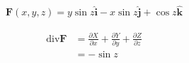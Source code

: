 \begin{align*}
    \boldsymbol{F}(x, y, z) = y\sin{z} \boldsymbol{\hat{i}} - x\sin{z} \boldsymbol{\hat{j}} + \cos{z} \boldsymbol{\hat{k}}
\end{align*}

\begin{solution}
\begin{align*}
    \mathrm{div}\boldsymbol{F} &= \frac{\partial X}{\partial x} + \frac{\partial Y}{\partial y} + \frac{\partial Z}{\partial z} \\
    &= -\sin{z}
\end{align*}
\end{solution}